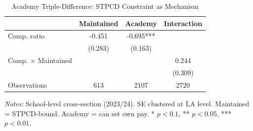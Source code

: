 \begin{table}[htbp]
\centering
\caption{Academy Triple-Difference: STPCD Constraint as Mechanism}
\label{tab:ddd}
\begin{tabular}{lccc}
\toprule
 & Maintained & Academy & Interaction \\
\midrule
Comp. ratio & -0.451 & -0.695*** & \\
 & (0.283) & (0.163) & \\
Comp. $\times$ Maintained & & & 0.244 \\
 & & & (0.309) \\
\midrule
Observations & 613 & 2107 & 2720 \\
\bottomrule
\end{tabular}
\begin{tablenotes}[flushleft]
\small
\item \textit{Notes:} School-level cross-section (2023/24). SE clustered at LA level. Maintained = STPCD-bound. Academy = can set own pay. * $p<0.1$, ** $p<0.05$, *** $p<0.01$.
\end{tablenotes}
\end{table}

